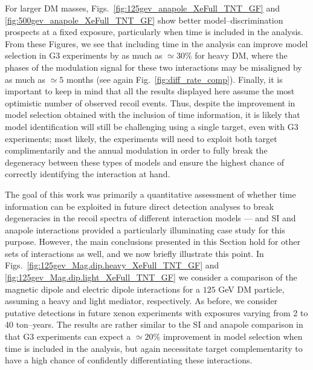 \documentclass[11pt, a4paper]{article}
\newcommand{\Fig}[1]{Fig.~\ref{#1}} \newcommand{\Figs}[2]{Figs.~\ref{#1} and \ref{#2}}
\begin{document}
For larger DM masses, Figs.~\ref{fig:125gev_anapole_XeFull_TNT_GF} and \ref{fig:500gev_anapole_XeFull_TNT_GF} show better model--discrimination prospects at a fixed exposure, particularly when time is included in the analysis. From these Figures, we see that including time in the analysis can improve model selection in G3 experiments by as much as $\simeq 30\%$ for heavy DM, where the phases of the modulation signal for these two interactions may be misaligned by as much as $\simeq 5$ months (see again \Fig{fig:diff_rate_comp}). Finally, it is important to keep in mind that all the results displayed here assume the most optimistic number of observed recoil events. Thus, despite the improvement in model selection obtained with the inclusion of time information, it is likely that model identification will still be challenging using a single target, even with G3 experiments; most likely, the experiments will need to exploit both target complimentarily and the annual modulation in order to fully break the degeneracy between these types of models and ensure the highest chance of correctly identifying the interaction at hand.


The goal of this work was primarily a quantitative assessment of whether time information can be exploited in future direct detection analyses to break degeneracies in the recoil spectra of different interaction models --- and SI and anapole interactions provided a particularly illuminating case study for this purpose. However, the main conclusions presented in this Section hold for other sets of interactions as well, and we now briefly illustrate this point. In \Figs{fig:125gev_Mag.dip.heavy_XeFull_TNT_GF}{fig:125gev_Mag.dip.light_XeFull_TNT_GF} we consider a comparison of the magnetic dipole and electric dipole interactions for a $125$ GeV DM particle, assuming a heavy and light mediator, respectively. As before, we consider putative detections in future xenon experiments with exposures varying from 2 to 40 ton--years. The results are rather similar to the SI and anapole comparison in that G3 experiments can expect a $\simeq 20\%$ improvement in model selection when time is included in the analysis, but again necessitate target complementarity to have a high chance of confidently differentiating these interactions.

\end{document}

